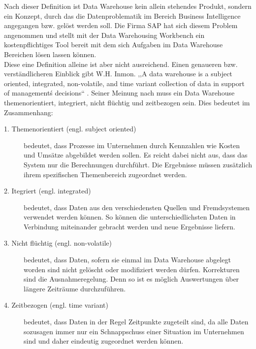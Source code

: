 Nach dieser Definition ist Data Warehouse kein allein stehendes Produkt, sondern ein Konzept, durch das die Datenproblematik im Bereich Business Intelligence  angegangen bzw. gelöst werden soll. Die Firma SAP hat sich diesem Problem angenommen und stellt mit der Data Warehousing Workbench ein kostenpflichtiges Tool bereit mit dem sich Aufgaben im Data Warehouse Bereichen lösen lassen können.  \\
Diese eine Definition alleine ist aber nicht ausreichend. Einen genaueren bzw. verständlicheren Einblick gibt W.H. Inmon. ,,A data warehouse is a subject oriented, integrated, non-volatile, and time variant collection of data in support of management\'s decisions`` \cite[S. 33]{Inmon:2005vg}. Seiner Meinung nach muss ein Data Warehouse themenorientiert, integriert, nicht flüchtig und zeitbezogen sein. Dies bedeutet im Zusammenhang: \\
\begin{description}
	\item [1. Themenorientiert (engl. subject oriented)] bedeutet, dass Prozesse im Unternehmen durch Kennzahlen wie Kosten und Umsätze abgebildet werden sollen. Es reicht dabei nicht aus, dass das System nur die Berechnungen durchführt. Die Ergebnisse müssen zusätzlich ihrem spezifischen Themenbereich zugeordnet werden. 
	\item [2. Itegriert (engl. integrated)] bedeutet, dass Daten aus den verschiedensten Quellen und Fremdsystemen verwendet werden können. So können die unterschiedlichsten Daten in Verbindung miteinander gebracht werden und neue Ergebnisse liefern.
	\item [3. Nicht flüchtig (engl. non-volatile)]bedeutet, dass Daten, sofern sie einmal im Data Warehouse abgelegt worden sind nicht gelöscht oder modifiziert werden dürfen. Korrekturen sind die Ausnahmeregelung. Denn so ist es möglich Auswertungen über längere Zeiträume durchzuführen.
	\item [4. Zeitbezogen (engl. time variant)] bedeutet, dass Daten in der Regel Zeitpunkte zugeteilt sind, da alle Daten sozusagen immer nur ein Schnappschuss einer Situation im Unternehmen sind und daher eindeutig zugeordnet werden können.
\end{description}




